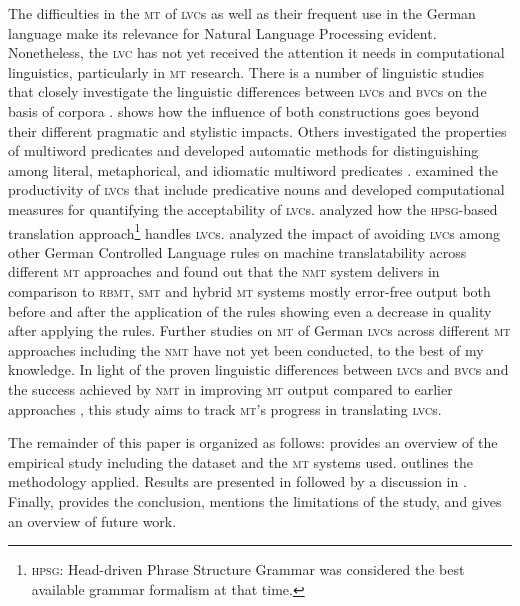 \documentclass[output=paper]{langsci/langscibook}
\begin{document}
The difficulties in the \textsc{mt} of \textsc{lvc}s as well as their frequent use in the German language make its relevance for Natural Language Processing evident. Nonetheless, the \textsc{lvc} has not yet received the attention it needs in computational linguistics, particularly in \textsc{mt} research. There is a number of linguistic studies that closely investigate the linguistic differences between \textsc{lvc}s and \textsc{bvc}s on the basis of corpora \citep{Glatz2006,Storrer2007,Storrer2006a}. \citet{Storrer2006a} shows how the influence of both constructions goes beyond their different pragmatic and stylistic impacts. Others investigated the properties of multiword predicates and developed automatic methods for distinguishing among literal, metaphorical, and idiomatic multiword predicates \citep*{Fazly2005}. \citet{North2005} examined the productivity of \textsc{lvc}s that include predicative nouns and developed computational measures for quantifying the acceptability of \textsc{lvc}s. \citet{Kuhn1994} analyzed how the \textsc{hpsg}-based translation approach\footnote{\textsc{hpsg}: Head-driven Phrase Structure Grammar \citep{Pollard1994}
was considered the best available grammar formalism at that time.} handles \textsc{lvc}s. \citet{Marzouk2019} analyzed the impact of avoiding \textsc{lvc}s among other German Controlled Language rules on machine translatability across different \textsc{mt} approaches and found out that the \textsc{nmt} system delivers in comparison to \textsc{rbmt}, \textsc{smt} and hybrid \textsc{mt} systems mostly error-free output both before and after the application of the rules showing even a decrease in quality after applying the rules. Further studies on \textsc{mt} of German \textsc{lvc}s across different \textsc{mt} approaches including the \textsc{nmt} have not yet been conducted, to the best of my knowledge. In light of the proven linguistic differences between \textsc{lvc}s and \textsc{bvc}s \citep{Glatz2006,Storrer2007,Storrer2006a} and the success achieved by \textsc{nmt} in improving \textsc{mt} output compared to earlier approaches \citep{Bentivogli2016,Marzouk2019,Popovic2018,Toral2017,}, this study aims to track \textsc{mt}’s progress in translating \textsc{lvc}s.

The remainder of this paper is organized as follows:  provides an overview of the empirical study including the dataset and the \textsc{mt} systems used.  outlines the methodology applied. Results are presented in  followed by a discussion in . Finally,  provides the conclusion, mentions the limitations of the study, and gives an overview of future work.
\end{document}
